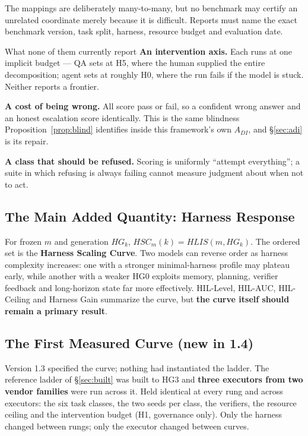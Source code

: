 \documentclass[11pt]{article}
\theoremstyle{definition}
\begin{document}
The mappings are deliberately many-to-many, but no benchmark may certify an unrelated coordinate merely because it is difficult. Reports must name the exact benchmark version, task split, harness, resource budget and evaluation date.

\begin{claimbox}{What none of them currently report}
\textbf{An intervention axis.} Each runs at one implicit budget --- QA sets at H5, where the human supplied the entire decomposition; agent sets at roughly H0, where the run fails if the model is stuck. Neither reports a frontier.

\textbf{A cost of being wrong.} All score pass or fail, so a confident wrong answer and an honest escalation score identically. This is the same blindness Proposition~\ref{prop:blind} identifies inside this framework's own $A_{DI}$, and \S\ref{sec:adi} is its repair.

\textbf{A class that should be refused.} Scoring is uniformly ``attempt everything''; a suite in which refusing is always failing cannot measure judgment about when not to act.
\end{claimbox}

\subsection{The Main Added Quantity: Harness Response}

For frozen $m$ and generation $HG_k$, $HSC_m(k) = HLIS(m,HG_k)$. The ordered set is the \textbf{Harness Scaling Curve}. Two models can reverse order as harness complexity increases: one with a stronger minimal-harness profile may plateau early, while another with a weaker HG0 exploits memory, planning, verifier feedback and long-horizon state far more effectively. HIL-Level, HIL-AUC, HIL-Ceiling and Harness Gain summarize the curve, but \textbf{the curve itself should remain a primary result}.

\subsection{The First Measured Curve (new in 1.4)}\label{sec:measured}

Version 1.3 specified the curve; nothing had instantiated the ladder. The reference ladder of \S\ref{sec:built} was built to HG3 and \textbf{three executors from two vendor families} were run across it. Held identical at every rung and across executors: the six task classes, the two seeds per class, the verifiers, the resource ceiling and the intervention budget (H1, governance only). Only the harness changed between rungs; only the executor changed between curves.
\end{document}
